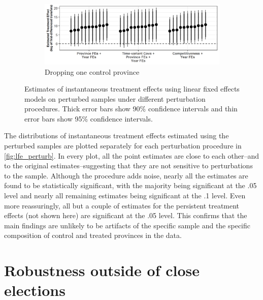 \documentclass[12pt]{article}
\newcommand{\1}{\mathbbm{1}}
\begin{document}
\begin{figure}[!htbp]
\begin{subfigure}{.8\textwidth}
		\centering
		\includegraphics[width=\textwidth]{figure/210202_perturb_results_control_drop.png}
		\captionsetup{singlelinecheck=off, justification=centering}
		\caption{Dropping one control province}
	\end{subfigure}
	\caption[Estimated linear fixed effects treatment effects on log of first-differenced central transfers for perturbed samples]{Estimates of instantaneous treatment effects using linear fixed effects models on perturbed samples under different perturbation procedures. Thick error bars show 90\% confidence intervals and thin error bars show 95\% confidence intervals.}
	\label{fig:lfe_perturb}
\end{figure}

The distributions of instantaneous treatment effects estimated using the perturbed samples are plotted separately for each perturbation procedure in \autoref{fig:lfe_perturb}. In every plot, all the point estimates are close to each other--and to the original estimates--suggesting that they are not sensitive to perturbations to the sample. Although the procedure adds noise, nearly all the estimates are found to be statistically significant, with the majority being significant at the .05 level and nearly all remaining estimates being significant at the .1 level. Even more reassuringly, all but a couple of  estimates for the persistent treatment effects (not shown here) are significant at the .05 level. This confirms that the main findings are unlikely to be artifacts of the specific sample and the specific composition of control and treated provinces in the data. 

\clearpage 

\section{Robustness outside of close elections}
\label{app:bandwidth}




\end{document}
